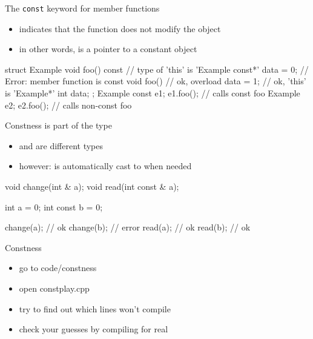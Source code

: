 \begin{frame}[fragile]
  \begin{block}{The \texttt{const} keyword for member functions}
    \begin{itemize}
    \item indicates that the function does not modify the object
    \item in other words,  is a pointer to a constant object
    \end{itemize}
  \end{block}
  \begin{cppcode}
    struct Example {
      void foo() const {
        // type of 'this' is 'Example const*'
        data = 0; // Error: member function is const
      }
      void foo() { // ok, overload
        data = 1;  // ok, 'this' is 'Example*'
      }
      int data;
    };
    Example const e1; e1.foo(); // calls     const foo
    Example       e2; e2.foo(); // calls non-const foo
  \end{cppcode}
\end{frame}

\begin{frame}[fragile]
  \begin{block}{Constness is part of the type}
    \begin{itemize}
    \item {} and  are different types
    \item however:  is automatically cast to  when needed
    \end{itemize}
  \end{block}
  \begin{cppcode}
    void change(int & a);
    void read(int const & a);

    int a = 0;
    int const b = 0;

    change(a); // ok
    change(b); // error
    read(a);   // ok
    read(b);   // ok
  \end{cppcode}
\end{frame}

\begin{frame}[fragile]
  \begin{exercise}{Constness}
    \begin{itemize}
    \item go to code/constness
    \item open constplay.cpp
    \item try to find out which lines won't compile
    \item check your guesses by compiling for real
    \end{itemize}
  \end{exercise}
\end{frame}
